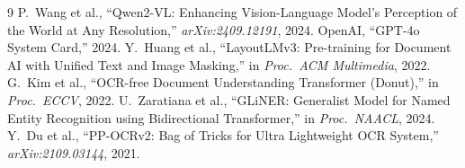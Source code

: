 \documentclass[10pt,twocolumn,letterpaper]{article}
\begin{document}
\begin{thebibliography}{9}\setlength{\itemsep}{1pt}\footnotesize
{} P.~Wang et al., ``Qwen2-VL: Enhancing Vision-Language Model's Perception of the World at Any Resolution,'' \emph{arXiv:2409.12191}, 2024.
 OpenAI, ``GPT-4o System Card,'' 2024.
 Y.~Huang et al., ``LayoutLMv3: Pre-training for Document AI with Unified Text and Image Masking,'' in \emph{Proc.\ ACM Multimedia}, 2022.
 G.~Kim et al., ``OCR-free Document Understanding Transformer (Donut),'' in \emph{Proc.\ ECCV}, 2022.
 U.~Zaratiana et al., ``GLiNER: Generalist Model for Named Entity Recognition using Bidirectional Transformer,'' in \emph{Proc.\ NAACL}, 2024.
 Y.~Du et al., ``PP-OCRv2: Bag of Tricks for Ultra Lightweight OCR System,'' \emph{arXiv:2109.03144}, 2021.
\end{thebibliography}
\end{document}
